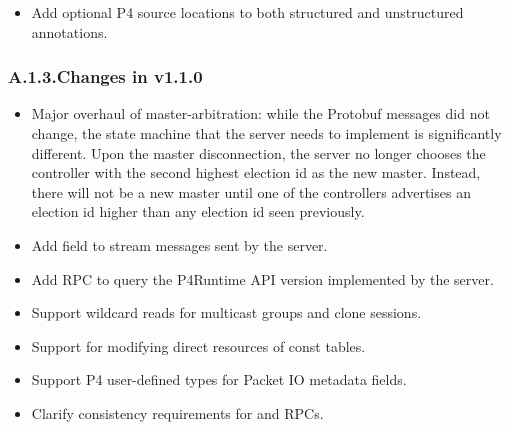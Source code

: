 \documentclass[11pt]{article}
\begin{document}
{\begin{itemize}[noitemsep,topsep=\mdcompacttopsep]
\item{}Add optional P4 source locations to both structured and unstructured
annotations.%
\end{itemize}%

\subsubsection{A.1.3.\hspace*{0.5em}Changes in v1.1.0}\label{sec-changes-in-v110}%

\begin{itemize}[noitemsep,topsep=\mdcompacttopsep]%

\item{}Major overhaul of master-arbitration: while the Protobuf messages did not
change, the state machine that the server needs to implement is significantly
different. Upon the master disconnection, the server no longer chooses the
controller with the second highest election id as the new master. Instead,
there will not be a new master until one of the controllers advertises an
election id higher than any election id seen previously.%

\item{}Add  field to stream messages sent by the server.%

\item{}Add  RPC to query the P4Runtime API version implemented by the
server.%

\item{}Support wildcard reads for multicast groups and clone sessions.%

\item{}Support for modifying direct resources of const tables.%

\item{}Support P4 user-defined types for Packet IO metadata fields.%

\item{}Clarify consistency requirements for  and  RPCs.%


\end{itemize}}
\end{document}
